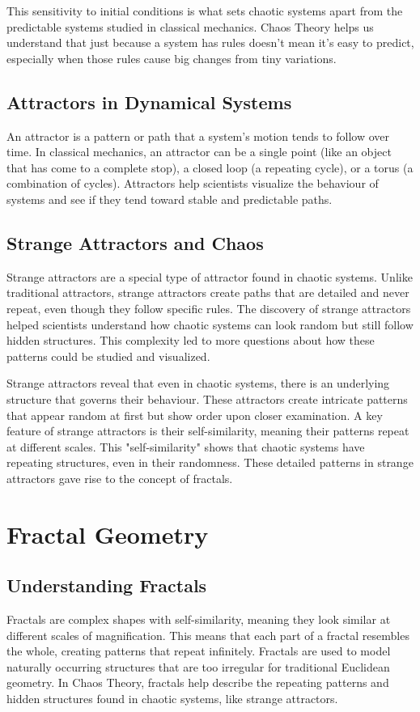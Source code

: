 \documentclass[12pt]{article}
\begin{document}
This sensitivity to initial conditions is what sets chaotic systems apart from the predictable systems studied in classical mechanics. Chaos Theory helps us understand that just because a system has rules doesn’t mean it’s easy to predict, especially when those rules cause big changes from tiny variations.

\subsection{Attractors in Dynamical Systems}
An attractor is a pattern or path that a system’s motion tends to follow over time. In classical mechanics, an attractor can be a single point (like an object that has come to a complete stop), a closed loop (a repeating cycle), or a torus (a combination of cycles). Attractors help scientists visualize the behaviour of systems and see if they tend toward stable and predictable paths.

\subsection{Strange Attractors and Chaos}
Strange attractors are a special type of attractor found in chaotic systems. Unlike traditional attractors, strange attractors create paths that are detailed and never repeat, even though they follow specific rules. The discovery of strange attractors helped scientists understand how chaotic systems can look random but still follow hidden structures. This complexity led to more questions about how these patterns could be studied and visualized.

Strange attractors reveal that even in chaotic systems, there is an underlying structure that governs their behaviour. These attractors create intricate patterns that appear random at first but show order upon closer examination. A key feature of strange attractors is their self-similarity, meaning their patterns repeat at different scales. This "self-similarity" shows that chaotic systems have repeating structures, even in their randomness. These detailed patterns in strange attractors gave rise to the concept of fractals.

\section{Fractal Geometry}


\subsection{Understanding Fractals}
Fractals are complex shapes with self-similarity, meaning they look similar at different scales of magnification. This means that each part of a fractal resembles the whole, creating patterns that repeat infinitely. Fractals are used to model naturally occurring structures that are too irregular for traditional Euclidean geometry. In Chaos Theory, fractals help describe the repeating patterns and hidden structures found in chaotic systems, like strange attractors. 
\end{document}
